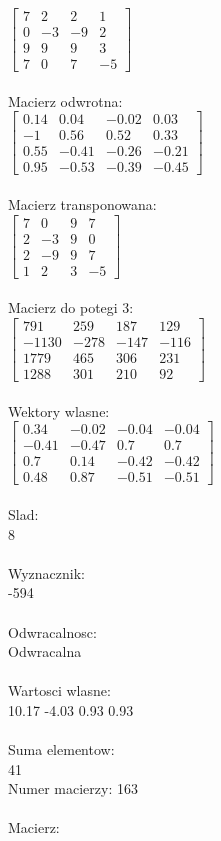 \documentclass[a4paper,12pt]{article}
\begin{document}
$\begin{bmatrix} 7&2&2&1\\0&-3&-9&2\\9&9&9&3\\7&0&7&-5 \end{bmatrix}$
\\
\\
Macierz odwrotna:\\

$\begin{bmatrix} 0.14&0.04&-0.02&0.03\\-1&0.56&0.52&0.33\\0.55&-0.41&-0.26&-0.21\\0.95&-0.53&-0.39&-0.45 \end{bmatrix}$
\\
\\
Macierz transponowana:\\

$\begin{bmatrix} 7&0&9&7\\2&-3&9&0\\2&-9&9&7\\1&2&3&-5 \end{bmatrix}$
\\
\\
Macierz do potegi 3:\\

$\begin{bmatrix} 791&259&187&129\\-1130&-278&-147&-116\\1779&465&306&231\\1288&301&210&92 \end{bmatrix}$
\\
\\
Wektory wlasne:\\

$\begin{bmatrix} 0.34&-0.02&-0.04&-0.04\\-0.41&-0.47&0.7&0.7\\0.7&0.14&-0.42&-0.42\\0.48&0.87&-0.51&-0.51 \end{bmatrix}$
\\
\\
Slad:\\
8
\\
\\
Wyznacznik:\\
-594
\\
\\
Odwracalnosc:\\
Odwracalna
\\
\\
Wartosci wlasne:\\
10.17 -4.03 0.93 0.93
\\
\\
Suma elementow:\\
41
\\
\newpage
Numer macierzy:
163
\\
\\
Macierz:\\
\end{document}
